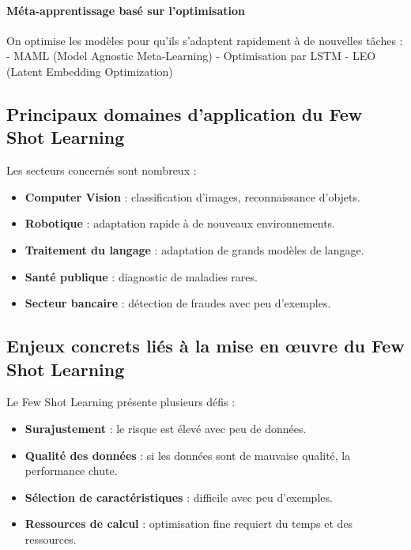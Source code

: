\paragraph*{Méta-apprentissage basé sur l’optimisation}
On optimise les modèles pour qu'ils s'adaptent rapidement à de nouvelles tâches
: - MAML (Model Agnostic Meta-Learning) - Optimisation par LSTM - LEO (Latent Embedding
Optimization)

\subsection*{Principaux domaines d’application du Few Shot Learning}
Les secteurs concernés sont nombreux :

\begin{itemize}
	\item \textbf{Computer Vision} : classification d’images, reconnaissance d’objets.

	\item \textbf{Robotique} : adaptation rapide à de nouveaux environnements.

	\item \textbf{Traitement du langage} : adaptation de grands modèles de langage.

	\item \textbf{Santé publique} : diagnostic de maladies rares.

	\item \textbf{Secteur bancaire} : détection de fraudes avec peu d’exemples.
\end{itemize}

\subsection*{Enjeux concrets liés à la mise en œuvre du Few Shot Learning}
Le Few Shot Learning présente plusieurs défis :
\begin{itemize}
	\item \textbf{Surajustement} : le risque est élevé avec peu de données.

	\item \textbf{Qualité des données} : si les données sont de mauvaise qualité, la
		performance chute.

	\item \textbf{Sélection de caractéristiques} : difficile avec peu d’exemples.

	\item \textbf{Ressources de calcul} : optimisation fine requiert du temps et
		des ressources.
\end{itemize}


